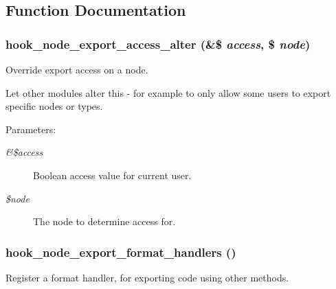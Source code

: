 \subsection{Function Documentation}
\hypertarget{node__export_8api_8php_07d300b1b84f51c8194ae2df7df69998}{
\subsubsection[{hook\_\-node\_\-export\_\-access\_\-alter}]{\setlength{\rightskip}{0pt plus 5cm}hook\_\-node\_\-export\_\-access\_\-alter (\&\$ {\em access}, \/  \$ {\em node})}}
\label{node__export_8api_8php_07d300b1b84f51c8194ae2df7df69998}


Override export access on a node.

Let other modules alter this - for example to only allow some users to export specific nodes or types.

\begin{Desc}
\item[Parameters:]
\begin{description}
\item[{\em \&\$access}]Boolean access value for current user. \item[{\em \$node}]The node to determine access for. \end{description}
\end{Desc}
\hypertarget{node__export_8api_8php_5d50afbf83e9ecf288b67e47a6e32226}{
\subsubsection[{hook\_\-node\_\-export\_\-format\_\-handlers}]{\setlength{\rightskip}{0pt plus 5cm}hook\_\-node\_\-export\_\-format\_\-handlers ()}}
\label{node__export_8api_8php_5d50afbf83e9ecf288b67e47a6e32226}


Register a format handler, for exporting code using other methods.

